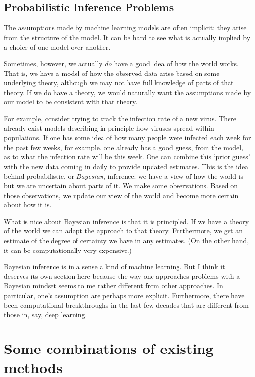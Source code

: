 \documentclass[10pt, a4paper, twocolumn]{article}
\begin{document}
\subsection{Probabilistic Inference Problems}

The assumptions made by machine learning models are often implicit: they arise
from the structure of the model. It can be hard to see what is actually implied
by a choice of one model over another.

Sometimes, however, we actually \emph{do} have a good idea of how the world
works. That is, we have a model of how the observed data arise based on some
underlying theory, although we may not have full knowledge of parts of that
theory. If we do have a theory, we would naturally want the assumptions made by
our model to be consistent with that theory.

For example, consider trying to track the infection rate of a new virus. There
already exist models describing in principle how viruses spread within
populations. If one has some idea of how many people were infected each week for
the past few weeks, for example, one already has a good guess, from the model,
as to what the infection rate will be this week. One can combine this `prior
guess' with the new data coming in daily to provide updated estimates. This is
the idea behind probabilistic, or \emph{Bayesian}, inference: we have a view of
how the world is but we are uncertain about parts of it. We make some
observations. Based on those observations, we update our view of the world and
become more certain about how it is.

What is nice about Bayesian inference is that it is principled. If we have a
theory of the world we can adapt the approach to that theory. Furthermore, we
get an estimate of the degree of certainty we have in any estimates. (On the
other hand, it can be computationally very expensive.)

Bayesian inference is in a sense a kind of machine learning. But I think it
deserves its own section here because the way one approaches problems with a
Bayesian mindset seems to me rather different from other approaches. In
particular, one's assumption are perhaps more explicit. Furthermore, there have
been computational breakthroughs in the last few decades that are different from
those in, say, deep learning.

\section{Some combinations of existing methods}  
\end{document}

